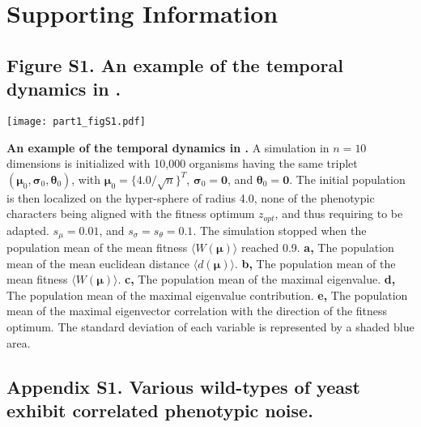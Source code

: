 \newpage


\section{Supporting Information}


\subsection{Figure S1. An example of the temporal dynamics in {\sigmaFGM}.}
\label{part1:FigureS1}

\begin{figurehere}
\begin{adjustwidth}{-0in}{0in}
\centering
\texttt{[image: part1\_figS1.pdf]}
\end{adjustwidth}
\caption[An example of the temporal dynamics in {\sigmaFGM}.]{
\textbf{An example of the temporal dynamics in {\sigmaFGM}.}
A simulation in $n=10$ dimensions is initialized with 10,000 organisms having the same triplet $(\boldsymbol{\mu}_0, \boldsymbol{\sigma}_0, \boldsymbol{\theta}_0)$, with $\boldsymbol{\mu}_0 = \{4.0/\sqrt{n}\}^T$, $\boldsymbol{\sigma}_0=\boldsymbol{0}$, and $\boldsymbol{\theta}_0=\boldsymbol{0}$. The initial population is then localized on the hyper-sphere of radius 4.0, none of the phenotypic characters being aligned with the fitness optimum $z_{opt}$, and thus requiring to be adapted. $s_\mu=0.01$, and $s_\sigma=s_\theta=0.1$. The simulation stopped when the population mean of the mean fitness $\langle W(\boldsymbol{\mu}) \rangle$ reached 0.9.
\textbf{a,} The population mean of the mean euclidean distance $\langle d(\boldsymbol{\mu}) \rangle$.
\textbf{b,} The population mean of the mean fitness $\langle W(\boldsymbol{\mu}) \rangle$.
\textbf{c,} The population mean of the maximal eigenvalue.
\textbf{d,} The population mean of the maximal eigenvalue contribution.
\textbf{e,} The population mean of the maximal eigenvector correlation with the direction of the fitness optimum.
The standard deviation of each variable is represented by a shaded blue area.
}
\label{figS1}
\end{figurehere}

\newpage


\subsection{Appendix S1. Various wild-types of yeast exhibit correlated phenotypic noise.}
\label{part1:AppendixS1}

